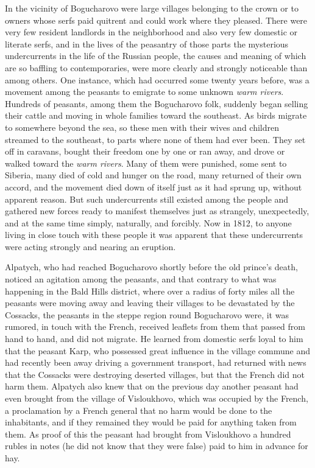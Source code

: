 In the vicinity of Bogucharovo were large villages belonging to
the crown or to owners whose serfs paid quitrent and could work
where they pleased. There were very few resident landlords in the
neighborhood and also very few domestic or literate serfs, and in
the lives of the peasantry of those parts the mysterious
undercurrents in the life of the Russian people, the causes and
meaning of which are so baffling to contemporaries, were more
clearly and strongly noticeable than among others. One instance,
which had occurred some twenty years before, was a movement among
the peasants to emigrate to some unknown \emph{warm rivers}.
Hundreds of peasants, among them the Bogucharovo folk, suddenly
began selling their cattle and moving in whole families toward
the southeast.  As birds migrate to somewhere beyond the sea, so
these men with their wives and children streamed to the
southeast, to parts where none of them had ever been. They set
off in caravans, bought their freedom one by one or ran away, and
drove or walked toward the \emph{warm rivers}. Many of them were
punished, some sent to Siberia, many died of cold and hunger on
the road, many returned of their own accord, and the movement
died down of itself just as it had sprung up, without apparent
reason.  But such undercurrents still existed among the people
and gathered new forces ready to manifest themselves just as
strangely, unexpectedly, and at the same time simply, naturally,
and forcibly. Now in 1812, to anyone living in close touch with
these people it was apparent that these undercurrents were acting
strongly and nearing an eruption.

Alpatych, who had reached Bogucharovo shortly before the old
prince's death, noticed an agitation among the peasants, and that
contrary to what was happening in the Bald Hills district, where
over a radius of forty miles all the peasants were moving away
and leaving their villages to be devastated by the Cossacks, the
peasants in the steppe region round Bogucharovo were, it was
rumored, in touch with the French, received leaflets from them
that passed from hand to hand, and did not migrate. He learned
from domestic serfs loyal to him that the peasant Karp, who
possessed great influence in the village commune and had recently
been away driving a government transport, had returned with news
that the Cossacks were destroying deserted villages, but that the
French did not harm them. Alpatych also knew that on the previous
day another peasant had even brought from the village of
Visloukhovo, which was occupied by the French, a proclamation by
a French general that no harm would be done to the inhabitants,
and if they remained they would be paid for anything taken from
them. As proof of this the peasant had brought from Visloukhovo a
hundred rubles in notes (he did not know that they were false)
paid to him in advance for hay.


